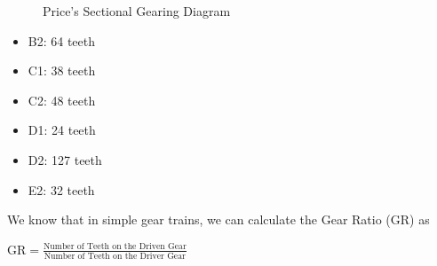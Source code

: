 \documentclass[11pt, oneside]{article}   	%
\theoremstyle{definition}
\begin{document}
\bigskip
\begin{figure}[H]
\caption{Price's Sectional Gearing Diagram \cite{gears_from_the_greeks}}
\label{fig:sectional_gearing}
\end{figure}

\bigskip
\begin{itemize}
\item B2: 64 teeth
\item C1: 38 teeth
\item C2: 48 teeth
\item D1: 24 teeth
\item D2: 127 teeth
\item E2: 32 teeth
\end{itemize}

\bigskip
\noindent
We know that in simple gear trains, we can calculate the Gear Ratio (GR) as 

\begin{center}
{\Large $\text{GR} = \frac{\text{Number of Teeth on the Driven Gear}}{\text{Number of Teeth on the Driver Gear}}$}
\end{center}
\end{document}
